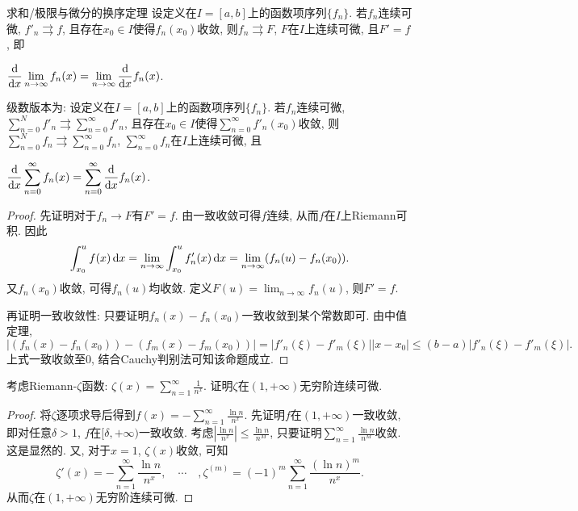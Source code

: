 \begin{theorem}{求和/极限与微分的换序定理}
	设定义在$I=[a,b]$上的函数项序列$\{ f_n \}$. 若$f_n$连续可微, $f'_n \rightrightarrows f$, 且存在$x_0 \in I$使得$f_n(x_0)$收敛, 则$f_n \rightrightarrows F$, $F$在$I$上连续可微, 且$F' = f$, 即
	\begin{center}
		$\displaystyle \frac{\mathop{}\!\mathrm{d}}{\mathop{}\!\mathrm{d} x} \lim_{n \to \infty} f_n(x) = \lim_{n\to \infty} \frac{\mathop{}\!\mathrm{d}}{\mathop{}\!\mathrm{d} x} f_n(x)$. 
	\end{center}
\end{theorem}
\begin{remark}
	级数版本为: 设定义在$I=[a,b]$上的函数项序列$\{ f_n \}$. 若$f_n$连续可微, $\sum_{n=0}^{N}f'_n \rightrightarrows \sum_{n=0}^{\infty} f'_n$, 且存在$x_0 \in I$使得$\sum_{n=0}^{\infty} f'_n(x_0)$收敛, 则$\sum_{n=0}^{N} f_n \rightrightarrows \sum_{n=0}^{\infty} f_n$, $\sum_{n=0}^{\infty} f_n$在$I$上连续可微, 且
	\begin{center}
		$\displaystyle \frac{\mathop{}\!\mathrm{d}}{\mathop{}\!\mathrm{d} x} \sum_{n=0}^{\infty} f_n(x) = \sum_{n=0}^{\infty} \frac{\mathop{}\!\mathrm{d}}{\mathop{}\!\mathrm{d} x} f_n(x)$. 
	\end{center}
\end{remark}
\begin{proof}
	先证明对于$f_n \to F$有$F'=f$. 由一致收敛可得$f$连续, 从而$f$在$I$上Riemann可积. 因此$$\int_{x_0}^{u} f(x) \mathop{}\!\mathrm{d} x = \lim_{n\to \infty} \int_{x_0}^{u} f'_n(x) \mathop{}\!\mathrm{d} x = \lim_{n\to \infty} (f_n(u)-f_n(x_0)). $$
	又$f_n(x_0)$收敛, 可得$f_n(u)$均收敛. 定义$F(u)=\lim_{n\to \infty}f_n(u)$, 则$F' = f$. 
	
	再证明一致收敛性: 只要证明$f_n(x)-f_n(x_0)$一致收敛到某个常数即可. 由中值定理, $$|(f_n(x)-f_n(x_0))-(f_m(x)-f_m(x_0))| = |f'_n(\xi)-f'_m(\xi)||x-x_0|\leq (b-a)|f'_n(\xi)-f'_m(\xi)|.$$
	上式一致收敛至$0$, 结合Cauchy判别法可知该命题成立. 
\end{proof}

\begin{example}
	考虑Riemann-$\zeta$函数: $\zeta (x) = \sum_{n=1}^{\infty} \frac{1}{n^x}$. 证明$\zeta$在$(1,+\infty)$无穷阶连续可微. 
\end{example}
\begin{proof}
	将$\zeta$逐项求导后得到$f(x) = -\sum_{n=1}^{\infty} \frac{\ln n}{n^x}$. 先证明$f$在$(1,+\infty )$一致收敛, 即对任意$\delta>1$, $f$在$[\delta ,+\infty )$一致收敛. 考虑$|\frac{\ln n}{n^x} | \leq \frac{\ln n}{n^M}$, 只要证明$\sum_{n=1}^{\infty} \frac{\ln n}{n^M}$收敛. 这是显然的. 又, 对于$x=1$, $\zeta (x)$收敛, 可知$$\zeta '(x) = -\sum_{n=1}^{\infty} \frac{\ln n}{n^x},\quad \cdots \quad , \zeta ^{(m)} = (-1)^m \sum_{n=1}^{\infty} \frac{(\ln n)^m}{n^x}.$$
	从而$\zeta$在$(1,+\infty)$无穷阶连续可微. 
\end{proof}


